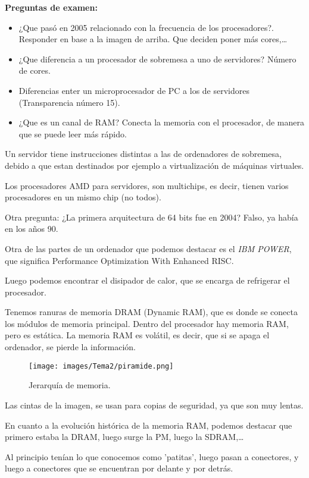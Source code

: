 \textbf{Preguntas de examen:}
\begin{itemize}
    \item ¿Que pasó en 2005 relacionado con la frecuencia de los procesadores?. Responder en base a la imagen de arriba. Que deciden poner más cores,\dots
    \item ¿Que diferencia a un procesador de sobremesa a uno de servidores? Número de cores.
    \item Diferencias enter un microprocesador de PC a los de servidores (Transparencia número 15).
    \item ¿Que es un canal de RAM? Conecta la memoria con el procesador, de manera que se puede leer más rápido.
\end{itemize}

Un servidor tiene instrucciones distintas a las de ordenadores de sobremesa, debido a que estan destinados por ejemplo a virtualización de máquinas virtuales.

Los procesadores AMD para servidores, son multichips, es decir, tienen varios procesadores en un mismo chip (no todos).

Otra pregunta:
¿La primera arquitectura de 64 bits fue en 2004? Falso, ya había en los años 90.

Otra de las partes de un ordenador que podemos destacar es el \textit{IBM POWER}, que significa Performance Optimization With Enhanced RISC.

Luego podemos encontrar el disipador de calor, que se encarga de refrigerar el procesador.

Tenemos ranuras de memoria DRAM (Dynamic RAM), que es donde se conecta los módulos de memoria principal. Dentro del procesador hay memoria RAM, pero es estática. La memoria RAM es volátil, es decir, que si se apaga el ordenador, se pierde la información.

\begin{figure}
    \centering
    \texttt{[image: images/Tema2/piramide.png]}
    \caption{Jerarquía de memoria.}
    \label{fig:2}
\end{figure}
Las cintas de la imagen, se usan para copias de seguridad, ya que son muy lentas.

En cuanto a la evolución histórica de la memoria RAM, podemos destacar que primero estaba la DRAM, luego surge la PM, luego la SDRAM,\dots

Al principio tenían lo que conocemos como 'patitas', luego pasan a conectores, y luego a conectores que se encuentran por delante y por detrás.

